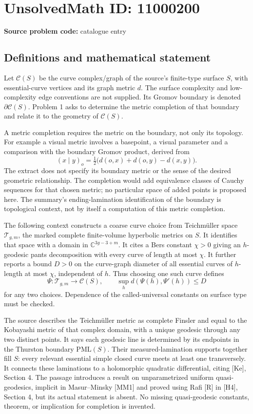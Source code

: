 \documentclass[11pt]{article}
\newcommand{\C}{\mathbb{C}}
\begin{document}
\section*{UnsolvedMath ID: 11000200}
\textbf{Source problem code:} catalogue entry
\subsection{Definitions and mathematical statement}
Let \(\mathcal C(S)\) be the curve complex/graph of the source's finite-type surface \(S\), with essential-curve vertices and its graph metric \(d\). The surface complexity and low-complexity edge conventions are not supplied. Its Gromov boundary is denoted \(\partial\mathcal C(S)\). Problem 1 asks to determine the metric completion of that boundary and relate it to the geometry of \(\mathcal C(S)\).

A metric completion requires the metric on the boundary, not only its topology. For example a visual metric involves a basepoint, a visual parameter and a comparison with the boundary Gromov product, derived from
\[
 (x\mid y)_o=\tfrac12\bigl(d(o,x)+d(o,y)-d(x,y)\bigr).
\]
The extract does not specify its boundary metric or the sense of the desired geometric relationship. The completion would add equivalence classes of Cauchy sequences for that chosen metric; no particular space of added points is proposed here. The summary's ending-lamination identification of the boundary is topological context, not by itself a computation of this metric completion.

The following context constructs a coarse curve choice from Teichmüller space \(\mathcal T_{g,m}\), the marked complete finite-volume hyperbolic metrics on \(S\). It identifies that space with a domain in \(\C^{3g-3+m}\). It cites a Bers constant \(\chi>0\) giving an \(h\)-geodesic pants decomposition with every curve of length at most \(\chi\). It further reports a bound \(D>0\) on the curve-graph diameter of all essential curves of \(h\)-length at most \(\chi\), independent of \(h\). Thus choosing one such curve defines
\[
 \Psi:\mathcal T_{g,m}\longrightarrow\mathcal C(S),\qquad
 \sup_h d(\Psi(h),\Psi'(h))\le D
\]
for any two choices. Dependence of the called-universal constants on surface type must be checked.

The source describes the Teichmüller metric as complete Finsler and equal to the Kobayashi metric of that complex domain, with a unique geodesic through any two distinct points. It says each geodesic line is determined by its endpoints in the Thurston boundary \(\mathrm{PML}(S)\). Their measured-lamination supports together fill \(S\): every relevant essential simple closed curve meets at least one transversely. It connects these laminations to a holomorphic quadratic differential, citing [Ke], Section 4. The passage introduces a result on unparametrized uniform quasi-geodesics, implicit in Masur--Minsky [MM1] and proved using Rafi [R] in [H4], Section 4, but its actual statement is absent. No missing quasi-geodesic constants, theorem, or implication for completion is invented.
\end{document}
